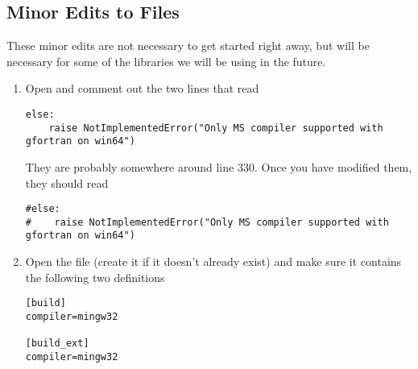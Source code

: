 \subsection*{Minor Edits to Files}
These minor edits are not necessary to get started right away, but will be necessary for some of the libraries we will be using in the future.
\begin{enumerate}
\item Open  and comment out the two lines that read 
\begin{lstlisting}
else:
    raise NotImplementedError("Only MS compiler supported with gfortran on win64")
\end{lstlisting}
They are probably somewhere around line $330$.
Once you have modified them, they should read
\begin{lstlisting}
#else:
#    raise NotImplementedError("Only MS compiler supported with gfortran on win64")
\end{lstlisting}

\item Open the file  (create it if it doesn't already exist) and make sure it contains the following two definitions
\begin{lstlisting}
[build]
compiler=mingw32

[build_ext]
compiler=mingw32
\end{lstlisting}

\end{enumerate}

